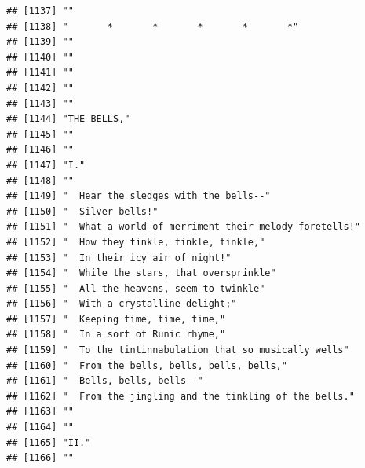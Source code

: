 \documentclass{article}\usepackage[]{graphicx}\usepackage[]{color}
\makeatletter
\newenvironment{kframe}{%
 \def\at@end@of@kframe{}%
 \ifinner\ifhmode%
  \def\at@end@of@kframe{\end{minipage}}%
  \begin{minipage}{\columnwidth}%
 \fi\fi%
 \def\FrameCommand##1{\hskip\@totalleftmargin \hskip-\fboxsep
 \colorbox{shadecolor}{##1}\hskip-\fboxsep
     \hskip-\linewidth \hskip-\@totalleftmargin \hskip\columnwidth}%
 \MakeFramed {\advance\hsize-\width
   \@totalleftmargin\z@ \linewidth\hsize
   \@setminipage}}%
 {\par\unskip\endMakeFramed%
 \at@end@of@kframe}
\newenvironment{knitrout}{}{} %
\makeatother
\begin{document}
\begin{knitrout}
\begin{kframe}
\begin{verbatim}
## [1137] ""                                                                            
## [1138] "       *       *       *       *       *"                                    
## [1139] ""                                                                            
## [1140] ""                                                                            
## [1141] ""                                                                            
## [1142] ""                                                                            
## [1143] ""                                                                            
## [1144] "THE BELLS,"                                                                  
## [1145] ""                                                                            
## [1146] ""                                                                            
## [1147] "I."                                                                          
## [1148] ""                                                                            
## [1149] "  Hear the sledges with the bells--"                                         
## [1150] "  Silver bells!"                                                             
## [1151] "  What a world of merriment their melody foretells!"                         
## [1152] "  How they tinkle, tinkle, tinkle,"                                          
## [1153] "  In their icy air of night!"                                                
## [1154] "  While the stars, that oversprinkle"                                        
## [1155] "  All the heavens, seem to twinkle"                                          
## [1156] "  With a crystalline delight;"                                               
## [1157] "  Keeping time, time, time,"                                                 
## [1158] "  In a sort of Runic rhyme,"                                                 
## [1159] "  To the tintinnabulation that so musically wells"                           
## [1160] "  From the bells, bells, bells, bells,"                                      
## [1161] "  Bells, bells, bells--"                                                     
## [1162] "  From the jingling and the tinkling of the bells."                          
## [1163] ""                                                                            
## [1164] ""                                                                            
## [1165] "II."                                                                         
## [1166] ""                                                                            

\end{verbatim}
\end{kframe}
\end{knitrout}
\end{document}
